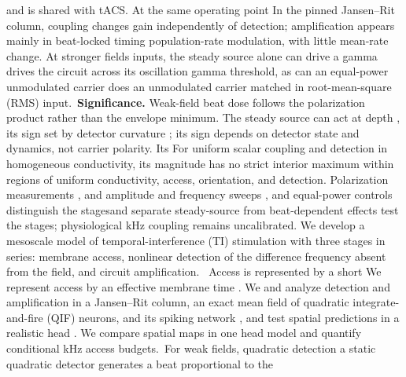 \documentclass[11pt,a4paper]{article}
\providecommand{\DIFaddtex}[1]{{\protect\color{blue} \sf #1}} %
\providecommand{\DIFdeltex}[1]{{\protect\color{red} \scriptsize #1}} %
\providecommand{\DIFaddbegin}{} %
\providecommand{\DIFaddend}{} %
\providecommand{\DIFdelbegin}{} %
\providecommand{\DIFdelend}{} %
\providecommand{\DIFadd}[1]{\texorpdfstring{\DIFaddtex{#1}}{#1}} %
\providecommand{\DIFdel}[1]{\texorpdfstring{\DIFdeltex{#1}}{}} %
\begin{document}
and is shared with tACS. \DIFdelbegin \DIFdel{At the same
operating point}\DIFdelend \DIFaddbegin \DIFadd{In the pinned Jansen--Rit column}\DIFaddend , coupling changes gain
independently of detection; amplification appears mainly in beat-locked \DIFdelbegin \DIFdel{timing}\DIFdelend \DIFaddbegin \DIFadd{population-rate
modulation}\DIFaddend , with little mean-rate change. At stronger \DIFdelbegin \DIFdel{fields }\DIFdelend \DIFaddbegin \DIFadd{inputs, }\DIFaddend the steady source alone \DIFdelbegin \DIFdel{can drive a gamma }\DIFdelend \DIFaddbegin \DIFadd{drives the }\DIFaddend circuit across its \DIFdelbegin \DIFdel{oscillation }\DIFdelend \DIFaddbegin \DIFadd{gamma
}\DIFaddend threshold, as \DIFdelbegin \DIFdel{can
an equal-power unmodulated carrier }\DIFdelend \DIFaddbegin \DIFadd{does an unmodulated carrier matched in root-mean-square (RMS) input}\DIFaddend .\
\textbf{Significance.} Weak-field beat dose follows the polarization product rather than the envelope minimum.
The steady source can act at depth\DIFdelbegin \DIFdel{, its sign set by detector curvature}\DIFdelend \DIFaddbegin \DIFadd{; its sign depends on detector state and dynamics}\DIFaddend ,
not carrier polarity. \DIFdelbegin \DIFdel{Its }\DIFdelend \DIFaddbegin \DIFadd{For uniform scalar coupling and detection in homogeneous
conductivity, its }\DIFaddend magnitude has no strict interior maximum\DIFdelbegin \DIFdel{within regions of uniform
conductivity, access, orientation, and detection}\DIFdelend . Polarization measurements \DIFdelbegin \DIFdel{, }\DIFdelend \DIFaddbegin \DIFadd{and }\DIFaddend amplitude and frequency sweeps \DIFdelbegin \DIFdel{, and equal-power controls distinguish the
stagesand separate
steady-source from beat-dependent effects}\DIFdelend \DIFaddbegin \DIFadd{test the
stages; physiological kHz coupling remains uncalibrated}\DIFaddend .
\else
We develop a mesoscale model of temporal-interference (TI) stimulation with three stages
in series: membrane access, nonlinear detection of the difference frequency absent from
the field, and circuit amplification.\ \DIFdelbegin \DIFdel{Access is represented by a short }\DIFdelend \DIFaddbegin \DIFadd{We represent access by an }\DIFaddend effective membrane time \DIFdelbegin \DIFdel{. We }\DIFdelend \DIFaddbegin \DIFadd{and }\DIFaddend analyze detection and
amplification in a Jansen--Rit column, an exact mean field of quadratic
integrate-and-fire \DIFaddbegin \DIFadd{(QIF) }\DIFaddend neurons, and its spiking network\DIFdelbegin \DIFdel{, and test spatial predictions in
a
realistic head }\DIFdelend \DIFaddbegin \DIFadd{. We compare spatial maps in
one head model and quantify conditional kHz access budgets}\DIFaddend .\ For weak fields, \DIFdelbegin \DIFdel{quadratic detection }\DIFdelend \DIFaddbegin \DIFadd{a static quadratic detector }\DIFaddend generates a beat proportional to the
\end{document}
